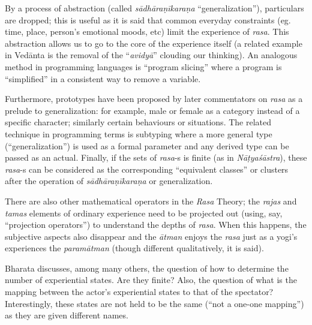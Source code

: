 By a process of abstraction (called \textsl{sādhāraṇīkaraṇa} “generalization”), particulars are dropped; this is useful as it is said that common everyday constraints (eg. time, place, person’s emotional moods, etc) limit the experience of \textsl{rasa}. This abstraction allows us to go to the core of the experience itself (a related example in Vedānta is the removal of the “\textsl{avidyā}” clouding our thinking). An analogous method in programming languages is “program slicing” where a program is “simplified” in a consistent way to remove a variable. 

Furthermore, prototypes have been proposed by later commentators on \textsl{rasa} as a prelude to generalization: for example, male or female as a category instead of a specific character; similarly certain behaviours or situations. The related technique in programming terms is subtyping where a more general type (“generalization”) is used as a formal parameter and any derived type can be passed as an actual. Finally, if the sets of \textsl{rasa}-s is finite (as in \textsl{Nāṭyaśāstra}), these \textsl{rasa}-s can be considered as the corresponding “equivalent classes” or clusters after the operation of \textsl{sādhāraṇīkaraṇa} or generalization. 

There are also other mathematical operators in the \textsl{Rasa} Theory; the \textsl{rajas} and \textsl{tamas} elements of ordinary experience need to be projected out (using, say, “projection operators”) to understand the depths of \textsl{rasa}. When this happens, the subjective aspects also disappear and the \textsl{ātman} enjoys the \textsl{rasa} just as a yogi’s experiences the \textsl{paramātman} (though different qualitatively, it is said).

Bharata discusses, among many others, the question of how to determine the number of experiential states. Are they finite? Also, the question of what is the mapping between the actor’s experiential states to that of the spectator? Interestingly, these states are not held to be the same (“not a one-one mapping”) as they are given different names.

